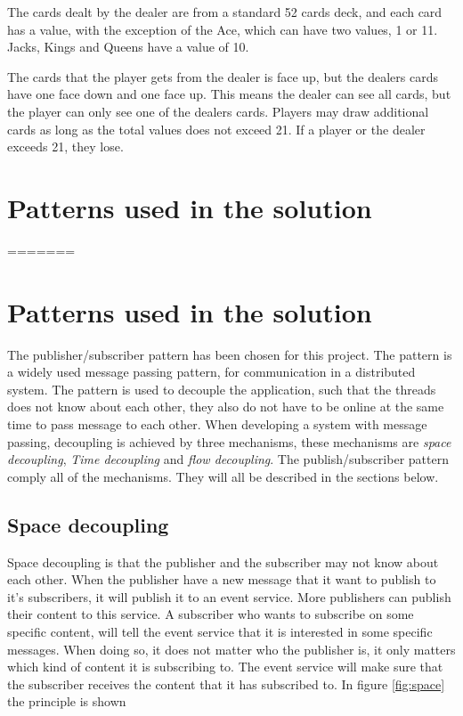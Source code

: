 The cards dealt by the dealer are from a standard 52 cards deck, and each card has a value, with the exception of the Ace, which can have two values, 1 or 11. Jacks, Kings and Queens have a value of 10.  

The cards that the player gets from the dealer is face up, but the dealers cards have one face down and one face up. This means the dealer can see all cards, but the player can only see one of the dealers cards. Players may draw additional cards as long as the total values does not exceed 21. If a player or the dealer exceeds 21, they lose. 

\section{Patterns used in the solution}
\label{chp:patterns}
=======
\section{Patterns used in the solution}
The publisher/subscriber pattern has been chosen for this project. The pattern is a widely used message passing pattern, for communication in a distributed system. The pattern is used to decouple the application, such that the threads does not know about each other, they also do not have to be online at the same time to pass message to each other. When developing a system with message passing, decoupling is achieved by three mechanisms, these mechanisms are \emph{space decoupling}, \emph{Time decoupling} and \emph{flow decoupling}. The publish/subscriber pattern comply all of the mechanisms. They will all be described in the sections below.

\subsection{Space decoupling}
Space decoupling is that the publisher and the subscriber may not know about each other. When the publisher have a new message that it want to publish to it's subscribers, it will publish it to an event service. More publishers can publish their content to this service. A subscriber who wants to subscribe on some specific content, will tell the event service that it is interested in some specific messages. When doing so, it does not matter who the publisher is, it only matters which kind of content it is subscribing to. The event service will make sure that the subscriber receives the content that it has subscribed to. In figure \ref{fig:space} the principle is shown

